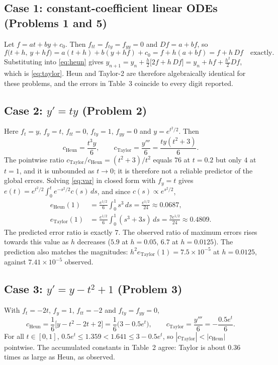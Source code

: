 \documentclass[10pt,letterpaper]{article}
\begin{document}
\subsection{Case 1: constant-coefficient linear ODEs (Problems 1 and 5)}
Let $f=at+by+c_0$. Then $f_{tt}=f_{ty}=f_{yy}=0$ and $Df=a+bf$, so
\[
f\big(t+h,\,y+hf\big)=a(t+h)+b(y+hf)+c_0=f+h(a+bf)=f+h\,Df\quad\text{exactly}.
\]
Substituting into \eqref{eq:heun} gives $y_{n+1}=y_n+\tfrac h2\big[2f+h\,Df\big]=y_n+hf+\tfrac{h^2}{2}Df$, which is \eqref{eq:taylor}. Heun and Taylor-2 are therefore algebraically identical for these problems, and the errors in Table~3 coincide to every digit reported.

\subsection{Case 2: $y'=ty$ (Problem 2)}
Here $f_t=y$, $f_y=t$, $f_{tt}=0$, $f_{ty}=1$, $f_{yy}=0$ and $y=e^{t^2/2}$. Then
\begin{equation}
c_{\text{Heun}}=\frac{t^3y}{6},\qquad c_{\text{Taylor}}=\frac{y'''}{6}=\frac{ty(t^2+3)}{6}.
\end{equation}
The pointwise ratio $c_{\text{Taylor}}/c_{\text{Heun}}=(t^2+3)/t^2$ equals $76$ at $t=0.2$ but only $4$ at $t=1$, and it is unbounded as $t\to0$; it is therefore not a reliable predictor of the global errors. Solving \eqref{eq:var} in closed form with $f_y=t$ gives $e(t)=e^{t^2/2}\int_0^t e^{-s^2/2}c(s)\,ds$, and since $c(s)\propto e^{s^2/2}$,
\begin{align}
e_{\text{Heun}}(1)&=\frac{e^{1/2}}{6}\int_0^1 s^3\,ds=\frac{e^{1/2}}{24}\approx0.0687,\\
e_{\text{Taylor}}(1)&=\frac{e^{1/2}}{6}\int_0^1 (s^3+3s)\,ds=\frac{7e^{1/2}}{24}\approx0.4809.
\end{align}
The predicted error ratio is exactly $7$. The observed ratio of maximum errors rises towards this value as $h$ decreases ($5.9$ at $h=0.05$, $6.7$ at $h=0.0125$). The prediction also matches the magnitudes: $h^2e_{\text{Taylor}}(1)=7.5\times10^{-5}$ at $h=0.0125$, against $7.41\times10^{-5}$ observed.

\subsection{Case 3: $y'=y-t^2+1$ (Problem 3)}
With $f_t=-2t$, $f_y=1$, $f_{tt}=-2$ and $f_{ty}=f_{yy}=0$,
\begin{equation}
c_{\text{Heun}}=\frac16\big[y-t^2-2t+2\big]=\frac16\big(3-0.5e^{t}\big),\qquad c_{\text{Taylor}}=\frac{y'''}{6}=-\frac{0.5e^{t}}{6}.
\end{equation}
For all $t\in[0,1]$, $0.5e^{t}\le1.359<1.641\le3-0.5e^{t}$, so $|c_{\text{Taylor}}|<|c_{\text{Heun}}|$ pointwise. The accumulated constants in Table~2 agree: Taylor is about $0.36$ times as large as Heun, as observed.
\end{document}
